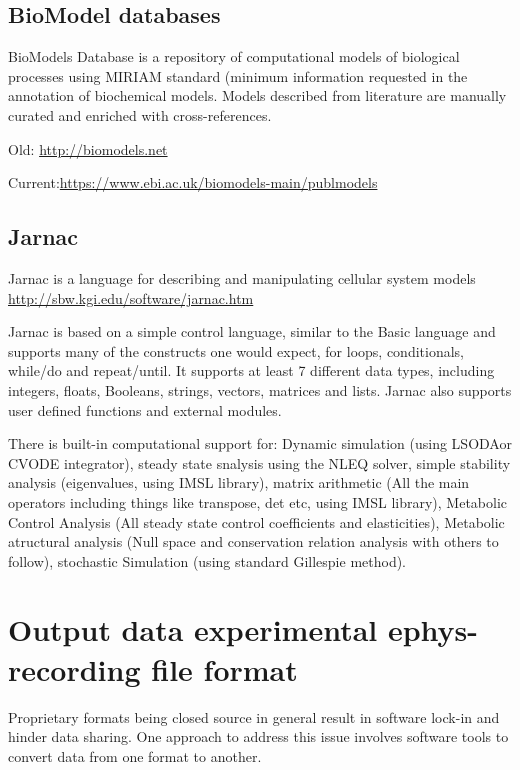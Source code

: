 \section{BioModel databases}
\label{sec:BioModel-database}

BioModels Database is a repository of computational models of biological
processes using MIRIAM standard (minimum information requested in the annotation
of biochemical models. Models described from literature are manually curated and
enriched with cross-references.


Old: \url{http://biomodels.net}

Current:\url{https://www.ebi.ac.uk/biomodels-main/publmodels}

\section{Jarnac}
\label{sec:Jarnac}

Jarnac is a language for describing and manipulating cellular system models 
\url{http://sbw.kgi.edu/software/jarnac.htm}

Jarnac is based on a simple control language, similar to the Basic language and
supports many of the constructs one would expect,  for loops, conditionals,
while/do and repeat/until. It supports at least 7 different data types,
including integers, floats, Booleans, strings, vectors, matrices and lists.
Jarnac also supports user defined functions and external modules.

There is built-in computational support for: Dynamic simulation (using LSODAor
CVODE integrator), steady state snalysis using the NLEQ solver, simple stability
analysis (eigenvalues, using IMSL library), matrix arithmetic (All the main
operators including things like transpose, det etc, using IMSL library),
Metabolic Control Analysis (All steady state control coefficients and
elasticities), Metabolic atructural analysis (Null space and conservation
relation analysis with others to follow), stochastic Simulation (using standard
Gillespie method).

\chapter{Output data experimental ephys-recording file format }

Proprietary formats being closed source in general result
in software lock-in and hinder data sharing. One approach
to address this issue involves software tools to convert data
from one format to another.

